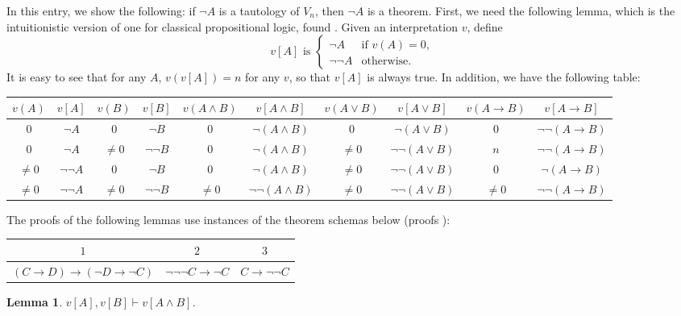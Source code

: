 \documentclass[12pt]{article}
\newtheorem{lem}{Lemma}
\begin{document}
In this entry, we show the following: if $\neg A$ is a tautology of $V_n$, then $\neg A$ is a theorem.  First, we need the following lemma, which is the intuitionistic version of one for classical propositional logic, found .
Given an interpretation $v$, define 
\begin{displaymath}
v[A] \textrm{ is }  \left\{
\begin{array}{ll}
\neg A & \textrm{if } v(A)=0,\\
\neg\neg A & \textrm{otherwise.}
\end{array}
\right.
\end{displaymath}
It is easy to see that for any $A$, $v(v[A])=n$ for any $v$, so that $v[A]$ is always true.  In addition, we have the following table:
\begin{center}
\begin{tabular}{|c|c|c|c|c|c|c|c|c|c|}
\hline
$v(A)$ & $v[A]$ & $v(B)$ & $v[B]$ & $v(A\land B)$ & $v[A\land B]$ & $v(A\lor B)$ & $v[A\lor B]$ & $v(A\to B)$ & $v[A\to B]$ \\
\hline\hline
$0$ & $\neg A$ & $0$ & $\neg B$ & $0$ & $\neg (A\land B)$ & $0$ & $\neg (A\lor B)$ & $0$ & $\neg \neg (A\to B)$ \\
\hline
$0$ & $\neg A$ & $\ne 0$ & $\neg \neg B$ & $0$ & $\neg (A\land B)$ & $\ne 0$ & $\neg \neg (A\lor B)$ & $n$ & $\neg \neg (A\to B)$ \\
\hline
$\ne 0$ & $\neg \neg A$ & $0$ & $\neg B$ & $0$ & $\neg (A\land B)$ & $\ne 0$ & $\neg \neg (A\lor B)$ & $0$ & $\neg (A\to B)$  \\
\hline
$\ne 0$ & $\neg \neg A$ & $\ne 0$ & $\neg \neg B$ & $\ne 0$ & $\neg \neg (A\land B)$ & $\ne 0$ & $\neg \neg (A\lor B)$ & $\ne 0$ & $\neg \neg (A\to B)$ \\
\hline
\end{tabular}
\end{center}
The proofs of the following lemmas use instances of the theorem schemas below (proofs ):
\begin{center}
\begin{tabular}{|c|c|c|}
\hline
$1$ & $2$ & $3$ \\
\hline\hline
$(C\to D)\to (\neg D\to \neg C)$ & $\neg \neg \neg C \to \neg C$ & $C \to \neg \neg C$ \\
\hline
\end{tabular}
\end{center}
\begin{lem}  
$v[A],v[B]\vdash v[A\land B]$.
\end{lem}
\end{document}
